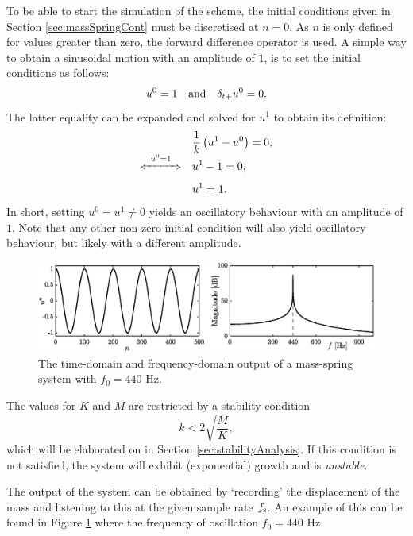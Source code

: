 To be able to start the simulation of the scheme, the initial conditions given in Section \ref{sec:massSpringCont} must be discretised at $n=0$. As $n$ is only defined for values greater than zero, the forward difference operator is used. A simple way to obtain a sinusoidal motion with an amplitude of $1$, is to set the initial conditions as follows: 
%
\begin{equation}
    u^0 = 1 \quad \text{and} \quad \delta_{t+} u^0 = 0.
\end{equation}
The latter equality can be expanded and solved for $u^1$ to obtain its definition: 
\begin{align*}
    &\frac{1}{k}\left(u^1 - u^0\right) = 0,\\[-1em]
    \xLeftrightarrow{\mystrut\ u^0 = 1\ }\quad &u^1 - 1 = 0,\\[0.1em]
 &u^1 = 1.
\end{align*}
In short, setting $u^0 = u^1 \neq 0$ yields an oscillatory behaviour with an amplitude of $1$. Note that any other non-zero initial condition will also yield oscillatory behaviour, but likely with a different amplitude.

\begin{figure}[b]
    \includegraphics[width=\textwidth]{figures/fdtd/massSpringOutput.eps}
    \caption{The time-domain and frequency-domain output of a mass-spring system with $f_0 = 440$ Hz. \label{fig:massSpringOutput}}
\end{figure}

The values for $K$ and $M$ are restricted by a stability condition
\begin{equation}
    k < 2\sqrt{\frac{M}{K}},
\end{equation}
which will be elaborated on in Section \ref{sec:stabilityAnalysis}. If this condition is not satisfied, the system will exhibit (exponential) growth and is \textit{unstable}. 

The output of the system can be obtained by `recording' the displacement of the mass and listening to this at the given sample rate $f_\text{s}$. An example of this can be found in Figure \ref{fig:massSpringOutput} where the frequency of oscillation $f_0 = 440$ Hz.


